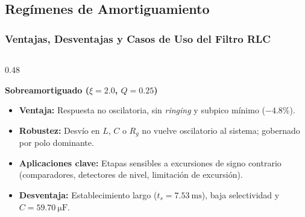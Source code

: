 \subsection{Regímenes de Amortiguamiento}
\begin{frame}
  \frametitle{Ventajas, Desventajas y Casos de Uso del Filtro RLC}

  \begin{columns}[t, onlytextwidth]
    \begin{column}{0.48\textwidth}
      \begin{tarjeta}[top=4pt, bottom=4pt]
        {\fontsize{8.5pt}{10pt}\selectfont \textbf{\color{NavyDark} Sobreamortiguado ($\xi = 2.0$, $Q = 0.25$)}}\\[2pt]
        {\fontsize{7.2pt}{8.8pt}\selectfont
        \begin{itemize}\setlength{\itemsep}{1.5pt}
          \item \textbf{Ventaja:} Respuesta no oscilatoria, sin \emph{ringing} y subpico mínimo ($\mathbf{-4.8\%}$).
          \item \textbf{Robustez:} Desvío en $L$, $C$ o $R_g$ no vuelve oscilatorio al sistema; gobernado por polo dominante.
          \item \textbf{Aplicaciones clave:} Etapas sensibles a excursiones de signo contrario (comparadores, detectores de nivel, limitación de excursión).
          \item \textbf{Desventaja:} Establecimiento largo ($t_s = \qty{7.53}{\milli\second}$), baja selectividad y $C = \qty{59.70}{\micro\farad}$.
        \end{itemize}
        }
      \end{tarjeta}
    \end{column}


\end{columns}
\end{frame}
